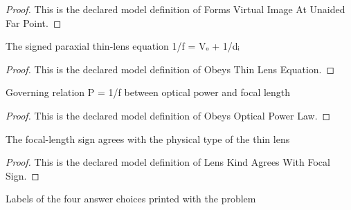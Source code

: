 \begin{proof}
  This is the declared model definition of Forms Virtual Image At Unaided Far Point.
\end{proof}
\begin{definition}
  \label{def:physics:phyx-mini-0130:phyxminiproblems-problemphyxmini0130-obeysthinlensequation}
  The signed paraxial thin-lens equation 1/f = Vₒ + 1/dᵢ
\end{definition}
\begin{proof}
  This is the declared model definition of Obeys Thin Lens Equation.
\end{proof}
\begin{definition}
  \label{def:physics:phyx-mini-0130:phyxminiproblems-problemphyxmini0130-obeysopticalpowerlaw}
  Governing relation P = 1/f between optical power and focal length
\end{definition}
\begin{proof}
  This is the declared model definition of Obeys Optical Power Law.
\end{proof}
\begin{definition}
  \label{def:physics:phyx-mini-0130:phyxminiproblems-problemphyxmini0130-lenskindagreeswithfocalsign}
  The focal-length sign agrees with the physical type of the thin lens
\end{definition}
\begin{proof}
  This is the declared model definition of Lens Kind Agrees With Focal Sign.
\end{proof}
\begin{definition}
  \label{def:physics:phyx-mini-0130:phyxminiproblems-problemphyxmini0130-answerchoice}
  Labels of the four answer choices printed with the problem
\end{definition}
